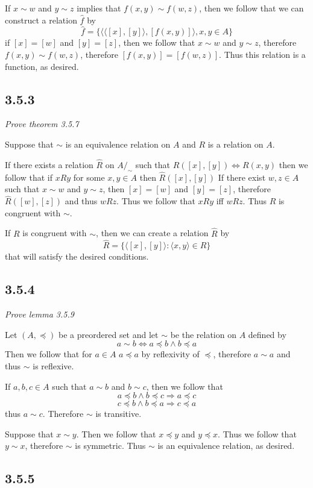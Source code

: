 \documentclass[11pt,oneside,titlepage]{book}
\DeclareMathOperator \ra {\Rightarrow}
\newcommand{\eangle}[1]{\langle #1 \rangle}
\begin{document}
If $x \sim w$ and $y \sim z$ implies that $f(x, y) \sim f(w, z)$, then we follow that
we can construct a relation
$\hat{f}$  by
$$\hat{f} = \{ \eangle{\eangle{[x], [y]}, [f(x, y)]}, x, y \in A\}$$
if $[x] = [w]$ and $[y] = [z]$, then we follow that $x \sim w$ and $y \sim z$, therefore
$f(x, y) \sim f(w, z)$, therefore  $[f(x, y)] = [f(w, z)]$. Thus this relation is a function, as
desired.

\subsection*{3.5.3}

\textit{Prove theorem 3.5.7}

Suppose that $\sim$ is an equivalence relation on $A$ and $R$ is a relation on $A$.

If there exists a relation $\hat{R}$ on $A/_\sim$ such that
$\hat{R}([x], [y]) \iff R(x, y)$
then we follow that if  $xRy$ for some $x, y \in A$ then $\hat{R}([x], [y])$
If there exist $w, z \in A$ such that
$x \sim w$ and $y \sim z$, then $[x] = [w]$ and $[y] = [z]$, therefore $\hat{R}([w], [z])$
and thus $wRz$. Thus we follow that $xRy$ iff $wRz$. Thus $R$ is congruent with $\sim$.

If $R$ is congruent with $\sim$, then we can create a relation $\hat{R}$ by
$$\hat{R} = \{\eangle{[x], [y]} : \eangle{x, y} \in R\}$$
that will satisfy the desired conditions.

\subsection*{3.5.4}

\textit{Prove lemma 3.5.9}

Let $(A, \preceq)$ be a preordered set and let $\sim$ be the relation on $A$ defined by
$$a \sim b \iff a \preceq b \land b \preceq a$$
Then we follow that for $a \in A$ $a \preceq a$ by reflexivity of $\preceq$, therefore
$a \sim a$ and thus $\sim$ is reflexive.

If $a, b, c \in A$ such that $a \sim b$ and $b \sim c$, then we follow that
$$a \preceq b \land b \preceq c \ra a \preceq c$$
$$c \preceq b \land b \preceq a \ra c \preceq a$$
thus $a \sim c$. Therefore $\sim$ is transitive.

Suppose that $x \sim y$. Then we follow that $x \preceq y $ and $y \preceq x$. Thus we follow that
$y \sim x$, therefore $\sim$ is symmetric. Thus $\sim$ is an equivalence relation, as desired.

\subsection*{3.5.5}
\end{document}
